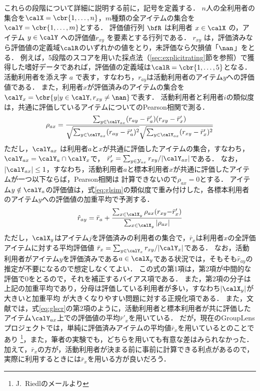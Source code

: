 これらの段階について詳細に説明する前に，記号を定義する．
$n$人の全利用者の集合を$\calX=\cbr{1,\ldots,n}$，$m$種類の全アイテムの集合を$\calY=\cbr{1,\ldots,m}$とする．
評価値行列 $\bfR$ は利用者 $x\in\calX$ の，アイテム $y\in \calY$ への評価値$r_{xy}$ を要素とする行列である．
$r_{xy}$ は，評価済みなら評価値の定義域$\calR$のいずれかの値をとり，未評価なら欠損値「$\nan$」をとる．
例えば，5段階のスコアを用いた採点法（\ref{sec:explicitrating}節を参照）で獲得した嗜好データであれば，評価値の定義域は$\calR=\cbr{1,\ldots,5}$となる．
活動利用者を添え字 $a$ で表す，すなわち，$r_{ay}$は活動利用者のアイテム$y$への評価値である．
また，利用者$x$が評価済みのアイテムの集合を$\calY_x=\cbr{y| y\in\calY, r_{xy}\ne\nan}$で表す．
活動利用者と利用者$i$の類似度は，共通に評価しているアイテムについてのPearson相関で測る．
\begin{equation}
\rho_{ax}=
\frac{\sum_{y\in\calY_{ax}}(r_{ay}-\bar{r}'_a)(r_{xy}-\bar{r}'_x)}%
{\sqrt{\sum_{y\in\calY_{ax}}(r_{ay}-\bar{r}'_a)^2}\sqrt{\sum_{y\in\calY_{ax}}(r_{xy}-\bar{r}'_x)^2}}
\label{eq:glsim}
\end{equation}
ただし，$\calY_{ax}$ は利用者$a$と$x$が共通に評価したアイテムの集合，すなわち，$\calY_{ax}=\calY_a\cap \calY_x$で，
${\bar{r}'}_x=\sum_{y\in \mathcal{Y}_{ax}}r_{xy}/|\calY_{ax}|$である．
なお，$|\calY_{ax}|\le1$，すなわち，活動利用者$a$と標本利用者$x$が共通に評価したアイテムが一つ以下ならば，Pearson相関は
計算できないので$\rho_{ax}=0$とする．
アイテム$y\notin\calY_a$の評価値は，式\eqref{eq:glsim}の類似度で重み付けした，各標本利用者のアイテム$y$への評価値の加重平均で予測する．
\begin{equation}
\hat{r}_{ay}=
\bar{r}_a+\frac{\sum_{x\in\calX_{y}}\rho_{ax}(r_{xy}{-}\bar{r}'_x)}{\sum_{x\in\calX_{y}}|\rho_{ax}|}
\label{eq:glscr}
\end{equation}
ただし，$\calX_y$はアイテム$j$を評価済みの利用者の集合で，$\bar{r}_{x}$は利用者$x$の全評価アイテムに対する平均評価値 $\bar{r}_x=\sum_{y\in\calY_x}r_{xy}/|\calY_x|$である．
なお，活動利用者がアイテム$y$を評価済みである$a\in\calX_y$である状況では，そもそも$\hat{r}_{ay}$の推定が不要になるので想定しなくてよい．
この式の第1項は，第2項が中間的な評価で0をとるので，それを補正するバイアス項である．
また，第2項の分子は上記の加重平均であり，分母は評価している利用者が多い，すなわち$|\calX_y|$が大きいと加重平均
が大きくなりやすい問題に対する正規化項である．
また，文献\cite{cscw:94:01}では，式\eqref{eq:glscr}の第2項のように，活動利用者と標本利用者が共に評価したアイテム$\calY_{ax}$上での評価値の平均$\bar{r}'_x$を用いている．
だが，現在のGroupLensプロジェクトでは，単純に評価済みアイテムの平均値$\bar{r}_x$を用いているとのことであり%
\footnote{J.~Riedlのメールより}，また，筆者の実験でも，どちらを用いても有意な差はみられなかった．
加えて，$\bar{r}_x$の方が，活動利用者が決まる前に事前に計算できる利点があるので，実際に利用するときには$\bar{r}_x$を用いる方が良いだろう．

